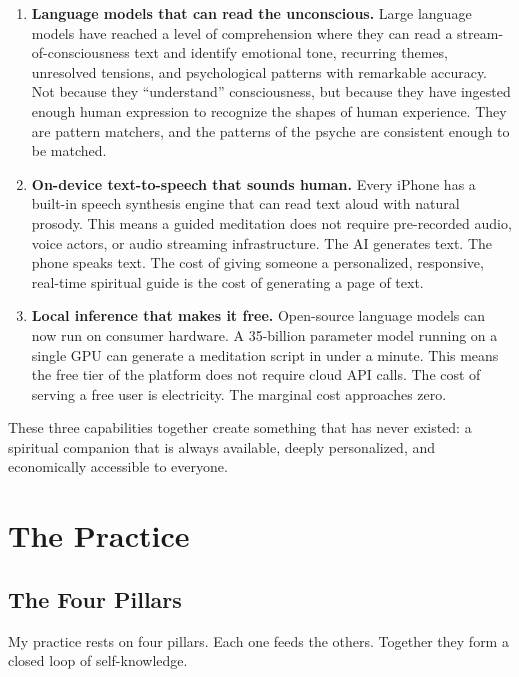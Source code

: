 \documentclass[12pt, a4paper]{article}
\begin{document}
\begin{enumerate}[leftmargin=2cm]
    \item \textbf{Language models that can read the unconscious.} Large language models have reached a level of comprehension where they can read a stream-of-consciousness text and identify emotional tone, recurring themes, unresolved tensions, and psychological patterns with remarkable accuracy. Not because they ``understand'' consciousness, but because they have ingested enough human expression to recognize the shapes of human experience. They are pattern matchers, and the patterns of the psyche are consistent enough to be matched.

    \item \textbf{On-device text-to-speech that sounds human.} Every iPhone has a built-in speech synthesis engine that can read text aloud with natural prosody. This means a guided meditation does not require pre-recorded audio, voice actors, or audio streaming infrastructure. The AI generates text. The phone speaks text. The cost of giving someone a personalized, responsive, real-time spiritual guide is the cost of generating a page of text.

    \item \textbf{Local inference that makes it free.} Open-source language models can now run on consumer hardware. A 35-billion parameter model running on a single GPU can generate a meditation script in under a minute. This means the free tier of the platform does not require cloud API calls. The cost of serving a free user is electricity. The marginal cost approaches zero.
\end{enumerate}

These three capabilities together create something that has never existed: a spiritual companion that is always available, deeply personalized, and economically accessible to everyone.

\section{The Practice}

\subsection{The Four Pillars}

My practice rests on four pillars. Each one feeds the others. Together they form a closed loop of self-knowledge.
\end{document}
